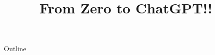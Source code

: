 \documentclass[xcolor=dvipsnames,compress,t,pdf,9pt]{beamer}
\title[\insertframenumber /\inserttotalframenumber]{From Zero to ChatGPT!!}
\begin{document}
	\begin{frame}
	\titlepage
	\end{frame}
	
	\begin{frame}{Outline}
	    \tableofcontents
	\end{frame}

	
	
	
\end{document}
